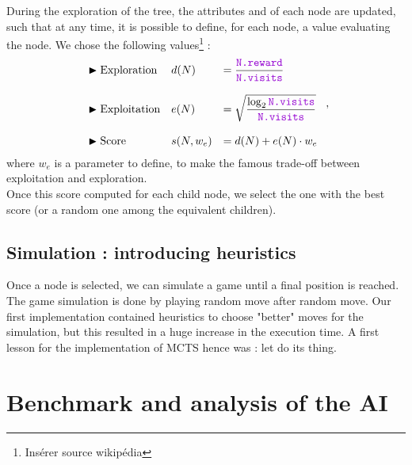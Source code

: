 \documentclass[11pt,a4paper]{article}
\begin{document}
During the exploration of the tree, the attributes  and  of each node are updated, such that at any time, it is possible to define, for each node, a value evaluating the node. We chose the following values\footnote{Insérer source wikipédia} :
$$
\begin{array}{lll}
    \blacktriangleright \text{Exploration} &d(N) &= \dfrac{\code{N.reward}}{\code{N.visits}} \\ \strut \\
    \blacktriangleright \text{Exploitation} &e(N) &= \sqrt{\dfrac{\log_2{\code{N.visits}}}{\code{N.visits}}} \\ \strut \\
    \blacktriangleright \text{Score} &s(N, w_e) &= d(N) + e(N)\cdot w_e \\
\end{array} \; ,
$$
where $w_e$ is a parameter to define, to make the famous trade-off between exploitation and exploration. \\

Once this score computed for each child node, we select the one with the best score (or a random one among the equivalent children).
\subsection{Simulation : introducing heuristics}
Once a node is selected, we can simulate a game until a final position is reached. The game simulation is done by playing random move after random move. Our first implementation contained heuristics to choose "better" moves for the simulation, but this resulted in a huge increase in the execution time. A first lesson for the implementation of MCTS hence was : let  do its thing.

\section{Benchmark and analysis of the AI}










\end{document}
